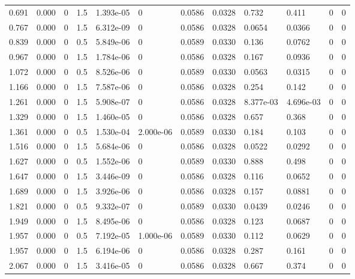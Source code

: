 \documentclass[preview]{standalone}
\begin{document}
{{\begin{tabular}{L{1.2cm}C{1.2cm} C{0.3cm}C{0.5cm} C{1.4cm}C{1.4cm} C{1.4cm}C{1.4cm} C{1.6cm}C{1.6cm} C{1.6cm}C{1.6cm}}
  0.691  &  0.000  & 0     & 1.5 &  1.393e-05  & 0  &  0.0586&   0.0328& 0.732 & 0.411   &  0 & 0  \\ 
  0.767  &  0.000  & 0     & 1.5 &  6.312e-09  & 0  &  0.0586&   0.0328& 0.0654 & 0.0366   &  0 & 0  \\ 
  0.839  &  0.000  & 0     & 0.5 &  5.849e-06  & 0  &  0.0589&   0.0330& 0.136 & 0.0762   &  0 & 0  \\ 
  0.967  &  0.000  & 0     & 1.5 &  1.784e-06  & 0  &  0.0586&   0.0328& 0.167 & 0.0936   &  0 & 0  \\ 
  1.072  &  0.000  & 0     & 0.5 &  8.526e-06  & 0  &  0.0589&   0.0330& 0.0563 & 0.0315   &  0 & 0  \\ 
  1.166  &  0.000  & 0     & 1.5 &  7.587e-06  & 0  &  0.0586&   0.0328& 0.254 & 0.142   &  0 & 0  \\ 
  1.261  &  0.000  & 0     & 1.5 &  5.908e-07  & 0  &  0.0586&   0.0328& 8.377e-03 & 4.696e-03   &  0 & 0  \\ 
  1.329  &  0.000  & 0     & 1.5 &  1.460e-05  & 0  &  0.0586&   0.0328& 0.657 & 0.368   &  0 & 0  \\ 
  1.361  &  0.000  & 0     & 0.5 &  1.530e-04  & 2.000e-06  &  0.0589&   0.0330& 0.184 & 0.103   &  0 & 0  \\ 
  1.516  &  0.000  & 0     & 1.5 &  5.684e-06  & 0  &  0.0586&   0.0328& 0.0522 & 0.0292   &  0 & 0  \\ 
  1.627  &  0.000  & 0     & 0.5 &  1.552e-06  & 0  &  0.0589&   0.0330& 0.888 & 0.498   &  0 & 0  \\ 
  1.647  &  0.000  & 0     & 1.5 &  3.446e-09  & 0  &  0.0586&   0.0328& 0.116 & 0.0652   &  0 & 0  \\ 
  1.689  &  0.000  & 0     & 1.5 &  3.926e-06  & 0  &  0.0586&   0.0328& 0.157 & 0.0881   &  0 & 0  \\ 
  1.821  &  0.000  & 0     & 0.5 &  9.332e-07  & 0  &  0.0589&   0.0330& 0.0439 & 0.0246   &  0 & 0  \\ 
  1.949  &  0.000  & 0     & 1.5 &  8.495e-06  & 0  &  0.0586&   0.0328& 0.123 & 0.0687   &  0 & 0  \\ 
  1.957  &  0.000  & 0     & 0.5 &  7.192e-05  & 1.000e-06  &  0.0589&   0.0330& 0.112 & 0.0629   &  0 & 0  \\ 
  1.957  &  0.000  & 0     & 1.5 &  6.194e-06  & 0  &  0.0586&   0.0328& 0.287 & 0.161   &  0 & 0  \\ 
  2.067  &  0.000  & 0     & 1.5 &  3.416e-05  & 0  &  0.0586&   0.0328& 0.667 & 0.374   &  0 & 0  \\ 

\end{tabular}}}
\end{document}
